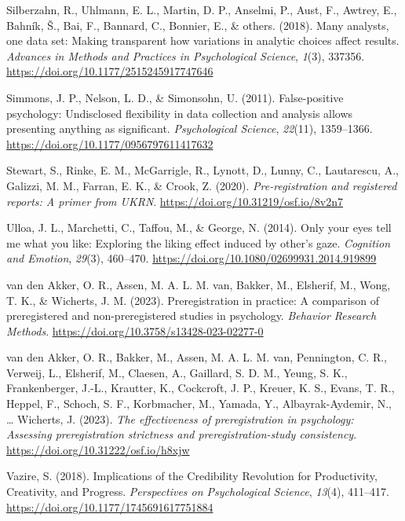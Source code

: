 \documentclass[
  man]{apa7}
\newlength{\cslhangindent}
\newlength{\cslentryspacingunit} %
\newenvironment{CSLReferences}[2] %
 {%
  \setlength{\parindent}{0pt}
  \ifodd #1
  \let\oldpar\par
  \def\par{\hangindent=\cslhangindent\oldpar}
  \fi
  \setlength{\parskip}{#2\cslentryspacingunit}
 }%
 {}
\begin{document}
\begin{CSLReferences}{1}{0}
\leavevmode{}%
Silberzahn, R., Uhlmann, E. L., Martin, D. P., Anselmi, P., Aust, F., Awtrey, E., Bahník, Š., Bai, F., Bannard, C., Bonnier, E., \& others. (2018). Many analysts, one data set: Making transparent how variations in analytic choices affect results. \emph{Advances in Methods and Practices in Psychological Science}, \emph{1}(3), 337356. \url{https://doi.org/10.1177/2515245917747646}

\leavevmode{}%
Simmons, J. P., Nelson, L. D., \& Simonsohn, U. (2011). False-positive psychology: Undisclosed flexibility in data collection and analysis allows presenting anything as significant. \emph{Psychological Science}, \emph{22}(11), 1359--1366. \url{https://doi.org/10.1177/0956797611417632}

\leavevmode{}%
Stewart, S., Rinke, E. M., McGarrigle, R., Lynott, D., Lunny, C., Lautarescu, A., Galizzi, M. M., Farran, E. K., \& Crook, Z. (2020). \emph{Pre-registration and registered reports: A primer from UKRN}. \url{https://doi.org/10.31219/osf.io/8v2n7}

\leavevmode{}%
Ulloa, J. L., Marchetti, C., Taffou, M., \& George, N. (2014). Only your eyes tell me what you like: Exploring the liking effect induced by other's gaze. \emph{Cognition and Emotion}, \emph{29}(3), 460--470. \url{https://doi.org/10.1080/02699931.2014.919899}

\leavevmode{}%
van den Akker, O. R., Assen, M. A. L. M. van, Bakker, M., Elsherif, M., Wong, T. K., \& Wicherts, J. M. (2023). Preregistration in practice: A comparison of preregistered and non-preregistered studies in psychology. \emph{Behavior Research Methods}. \url{https://doi.org/10.3758/s13428-023-02277-0}

\leavevmode{}%
van den Akker, O. R., Bakker, M., Assen, M. A. L. M. van, Pennington, C. R., Verweij, L., Elsherif, M., Claesen, A., Gaillard, S. D. M., Yeung, S. K., Frankenberger, J.-L., Krautter, K., Cockcroft, J. P., Kreuer, K. S., Evans, T. R., Heppel, F., Schoch, S. F., Korbmacher, M., Yamada, Y., Albayrak-Aydemir, N., \ldots{} Wicherts, J. (2023). \emph{The effectiveness of preregistration in psychology: Assessing preregistration strictness and preregistration-study consistency}. \url{https://doi.org/10.31222/osf.io/h8xjw}

\leavevmode{}%
Vazire, S. (2018). Implications of the Credibility Revolution for Productivity, Creativity, and Progress. \emph{Perspectives on Psychological Science}, \emph{13}(4), 411--417. \url{https://doi.org/10.1177/1745691617751884}

\end{CSLReferences}

\endgroup
\end{document}

